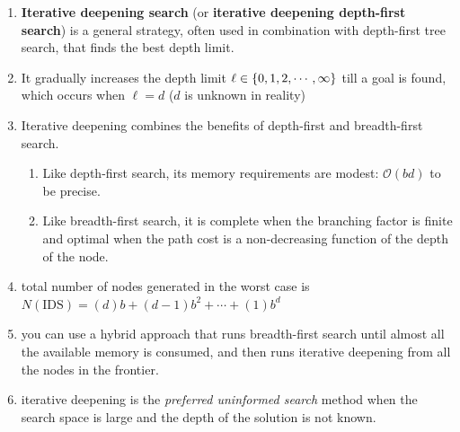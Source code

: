 \begin{enumerate}
    \item \textbf{Iterative deepening search} (or \textbf{iterative deepening depth-first search}) is a general strategy, often used in combination with depth-first tree search, that finds the best depth limit.
    \hfill \cite{ai/book/Artificial-Intelligence-A-Modern-Approach/Russell-Norvig}

    \item It gradually increases the depth limit $\ell \in \left\{0,1,2,\cdots,\infty\right\}$ till a goal is found, which occurs when $\ell = d$ ($d$ is unknown in reality)
    \hfill \cite{ai/book/Artificial-Intelligence-A-Modern-Approach/Russell-Norvig}

    \item Iterative deepening combines the benefits of depth-first and breadth-first search.
    \hfill \cite{ai/book/Artificial-Intelligence-A-Modern-Approach/Russell-Norvig}
    \begin{enumerate}
        \item Like depth-first search, its memory requirements are modest: $\mathcal{O}(b d)$ to be precise.
        \hfill \cite{ai/book/Artificial-Intelligence-A-Modern-Approach/Russell-Norvig}

        \item Like breadth-first search, it is complete when the branching factor is finite and optimal when the path cost is a non-decreasing function of the depth of the node.
        \hfill \cite{ai/book/Artificial-Intelligence-A-Modern-Approach/Russell-Norvig}
    \end{enumerate}

    \item total number of nodes generated in the worst case is
    \\
    $N(\text{IDS})=(d)b + (d - 1)b^2 + \cdots + (1)b^d$
    \hfill \cite{ai/book/Artificial-Intelligence-A-Modern-Approach/Russell-Norvig}

    \item you can use a hybrid approach that runs breadth-first search until almost all the available memory is consumed, and then runs iterative deepening from all the nodes in the frontier.
    \hfill \cite{ai/book/Artificial-Intelligence-A-Modern-Approach/Russell-Norvig}

    \item iterative deepening is the \textit{preferred uninformed search} method when the search space is large and the depth of the solution is not known.
    \hfill \cite{ai/book/Artificial-Intelligence-A-Modern-Approach/Russell-Norvig}


\end{enumerate}
